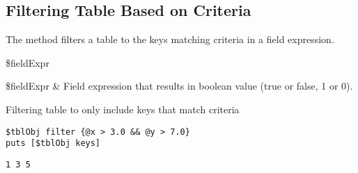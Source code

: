\subsection{Filtering Table Based on Criteria}
The method  filters a table to the keys matching criteria in a field expression. 
\begin{syntax}
 \$fieldExpr
\end{syntax}
\begin{args}
\$fieldExpr & Field expression that results in boolean value (true or false, 1 or 0).
\end{args}
\begin{example}{Filtering table to only include keys that match criteria}
\begin{lstlisting}
$tblObj filter {@x > 3.0 && @y > 7.0}
puts [$tblObj keys]
\end{lstlisting}
\tcblower
\begin{lstlisting}
1 3 5
\end{lstlisting}
\end{example}

\clearpage

